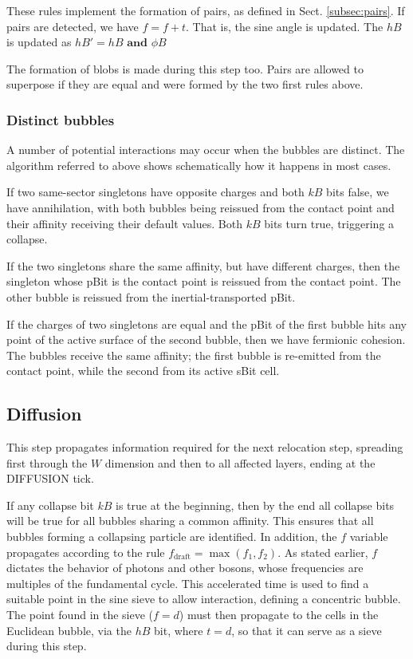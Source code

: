 \documentclass[12pt,english]{article}
\begin{document}
These rules implement the formation of pairs, as defined in Sect. \ref{subsec:pairs}. If pairs are detected, we have $f=f+t$. That is, the sine angle is updated. The $hB$ is updated as $hB'=hB$ $\textbf{and}$ $\phi B$

The formation of blobs is made during this step too. Pairs are allowed to superpose if they are equal and were formed by the two first rules above.

\subsubsection{Distinct bubbles} \label{subsec:distinct}
A number of potential interactions may occur when the bubbles are distinct. The algorithm referred to above shows schematically how it happens in most cases.

If two same-sector singletons have opposite charges and both $kB$ bits false, we have annihilation, with both bubbles being reissued from the contact point and their affinity receiving their default values. Both $kB$ bits turn true, triggering a collapse.

If the two singletons share the same affinity, but have different charges, then the singleton whose pBit is the contact point is reissued from the contact point. The other bubble is reissued from the inertial-transported pBit.

If the charges of two singletons are equal and the pBit of the first bubble hits any point of the active surface of the second bubble, then we have fermionic cohesion. The bubbles receive the same affinity; the first bubble is re-emitted from the contact point, while the second from its active sBit cell.

\subsection{Diffusion}

This step propagates information required for the next relocation step, spreading first through the \(W\) dimension and then to all affected layers, ending at the DIFFUSION tick.

If any collapse bit \(kB\) is true at the beginning, then by the end all collapse bits will be true for all bubbles sharing a common affinity. This ensures that all bubbles forming a collapsing particle are identified. In addition, the \(f\) variable propagates according to the rule \(f_{\text{draft}} = \max(f_1,f_2)\). As stated earlier, \(f\) dictates the behavior of photons and other bosons, whose frequencies are multiples of the fundamental cycle. This accelerated time is used to find a suitable point in the sine sieve to allow interaction, defining a concentric bubble. The point found in the sieve (\(f=d\)) must then propagate to the cells in the Euclidean bubble, via the \(hB\) bit, where \(t=d\), so that it can serve as a sieve during this step.
\end{document}
